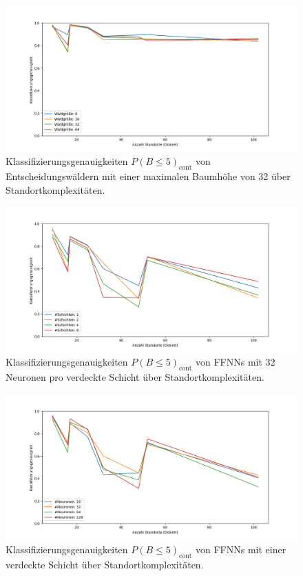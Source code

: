 \begin{figure}[h!]
    \centering
    \includegraphics[width=\linewidth]{images/multiple_best_by_group_dt_trees_acc_5_cont.png}
    \caption{Klassifizierungsgenauigkeiten $P(B\leq5)_{\text{cont}}$ von Entscheidungswäldern mit einer maximalen Baumhöhe von 32 über Standortkomplexitäten.}
    \label{fig:multiple_best_by_group_dt_trees_acc_5_cont}
\end{figure}

\begin{figure}[h!]
    \centering
    \includegraphics[width=\linewidth]{images/multiple_best_by_group_knn_layers_acc_5_cont.png}
    \caption{Klassifizierungsgenauigkeiten $P(B\leq5)_{\text{cont}}$ von FFNNs mit 32 Neuronen pro verdeckte Schicht über Standortkomplexitäten.}
    \label{fig:multiple_best_by_group_knn_layers_acc_5_cont}
\end{figure}

\begin{figure}[h!]
    \centering
    \includegraphics[width=\linewidth]{images/multiple_best_by_group_knn_neurons_acc_5_cont.png}
    \caption{Klassifizierungsgenauigkeiten $P(B\leq5)_{\text{cont}}$ von FFNNs mit einer verdeckte Schicht über Standortkomplexitäten.}
    \label{fig:multiple_best_by_group_knn_neurons_acc_5_cont}
\end{figure}

